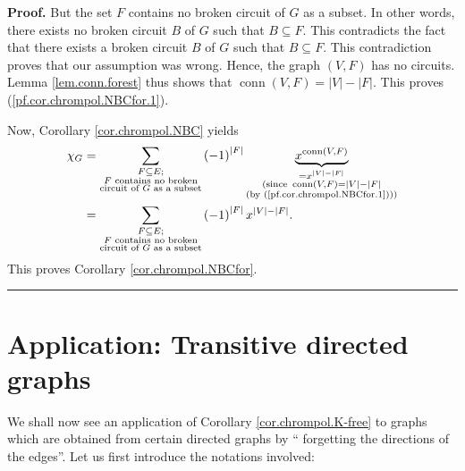 \documentclass[numbers=enddot,12pt,final,onecolumn,notitlepage]{scrartcl}%
\theoremstyle{definition}
\newenvironment{proof}[1][Proof]{\noindent\textbf{#1.} }{\ \rule{0.5em}{0.5em}}
\newenvironment{verlong}{}{}
\let\sumnonlimits\sum
\renewcommand{\sum}{\sumnonlimits\limits}
\begin{document}
\begin{verlong}
\begin{proof}
But the set $F$ contains no broken circuit of $G$ as a subset. In other words,
there exists no broken circuit $B$ of $G$ such that $B\subseteq F$. This
contradicts the fact that there exists a broken circuit $B$ of $G$ such that
$B\subseteq F$. This contradiction proves that our assumption was wrong.
Hence, the graph $\left(  V,F\right)  $ has no circuits. Lemma
\ref{lem.conn.forest} thus shows that $\operatorname*{conn}\left(  V,F\right)
=\left\vert V\right\vert -\left\vert F\right\vert $. This proves
(\ref{pf.cor.chrompol.NBCfor.1}).

Now, Corollary \ref{cor.chrompol.NBC} yields%
\begin{align*}
\chi_{G}  &  =\sum_{\substack{F\subseteq E;\\F\text{ contains no
broken}\\\text{circuit of }G\text{ as a subset}}}\left(  -1\right)
^{\left\vert F\right\vert }\underbrace{x^{\operatorname*{conn}\left(
V,F\right)  }}_{\substack{=x^{\left\vert V\right\vert -\left\vert F\right\vert
}\\\text{(since }\operatorname*{conn}\left(  V,F\right)  =\left\vert
V\right\vert -\left\vert F\right\vert \\\text{(by
(\ref{pf.cor.chrompol.NBCfor.1})))}}}\\
&  =\sum_{\substack{F\subseteq E;\\F\text{ contains no broken}\\\text{circuit
of }G\text{ as a subset}}}\left(  -1\right)  ^{\left\vert F\right\vert
}x^{\left\vert V\right\vert -\left\vert F\right\vert }.
\end{align*}
This proves Corollary \ref{cor.chrompol.NBCfor}.
\end{proof}
\end{verlong}

\section{\label{sec.trans}Application: Transitive directed graphs}

We shall now see an application of Corollary \ref{cor.chrompol.K-free} to
graphs which are obtained from certain directed graphs by \textquotedblleft
forgetting the directions of the edges\textquotedblright. Let us first
introduce the notations involved:
\end{document}
